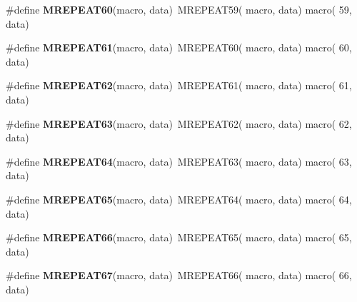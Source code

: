 \begin{DoxyCompactItemize}
\item 
\hypertarget{group__group__sam0__utils__mrepeat_ga4fd4e49134a22edba74f048333b8a4e6}{}\#define {\bfseries M\+R\+E\+P\+E\+A\+T60}(macro,  data)~M\+R\+E\+P\+E\+A\+T59( macro, data)   macro( 59, data)\label{group__group__sam0__utils__mrepeat_ga4fd4e49134a22edba74f048333b8a4e6}

\item 
\hypertarget{group__group__sam0__utils__mrepeat_ga91e94a0bcf2b901fcc9132cd2d20e5fc}{}\#define {\bfseries M\+R\+E\+P\+E\+A\+T61}(macro,  data)~M\+R\+E\+P\+E\+A\+T60( macro, data)   macro( 60, data)\label{group__group__sam0__utils__mrepeat_ga91e94a0bcf2b901fcc9132cd2d20e5fc}

\item 
\hypertarget{group__group__sam0__utils__mrepeat_gac1aeda59af63e68b3212be845b9b1f5a}{}\#define {\bfseries M\+R\+E\+P\+E\+A\+T62}(macro,  data)~M\+R\+E\+P\+E\+A\+T61( macro, data)   macro( 61, data)\label{group__group__sam0__utils__mrepeat_gac1aeda59af63e68b3212be845b9b1f5a}

\item 
\hypertarget{group__group__sam0__utils__mrepeat_ga73cede98c09bbcf55a373fbd3cfef422}{}\#define {\bfseries M\+R\+E\+P\+E\+A\+T63}(macro,  data)~M\+R\+E\+P\+E\+A\+T62( macro, data)   macro( 62, data)\label{group__group__sam0__utils__mrepeat_ga73cede98c09bbcf55a373fbd3cfef422}

\item 
\hypertarget{group__group__sam0__utils__mrepeat_gae9165e7c138bde7089d78f4d39123c80}{}\#define {\bfseries M\+R\+E\+P\+E\+A\+T64}(macro,  data)~M\+R\+E\+P\+E\+A\+T63( macro, data)   macro( 63, data)\label{group__group__sam0__utils__mrepeat_gae9165e7c138bde7089d78f4d39123c80}

\item 
\hypertarget{group__group__sam0__utils__mrepeat_ga823d5579d3d70018be17ac8323d074be}{}\#define {\bfseries M\+R\+E\+P\+E\+A\+T65}(macro,  data)~M\+R\+E\+P\+E\+A\+T64( macro, data)   macro( 64, data)\label{group__group__sam0__utils__mrepeat_ga823d5579d3d70018be17ac8323d074be}

\item 
\hypertarget{group__group__sam0__utils__mrepeat_ga900ae85fc32323d04086e2dd4ce7a275}{}\#define {\bfseries M\+R\+E\+P\+E\+A\+T66}(macro,  data)~M\+R\+E\+P\+E\+A\+T65( macro, data)   macro( 65, data)\label{group__group__sam0__utils__mrepeat_ga900ae85fc32323d04086e2dd4ce7a275}

\item 
\hypertarget{group__group__sam0__utils__mrepeat_ga4cb1fbebc5e11842a5e69ce245997668}{}\#define {\bfseries M\+R\+E\+P\+E\+A\+T67}(macro,  data)~M\+R\+E\+P\+E\+A\+T66( macro, data)   macro( 66, data)\label{group__group__sam0__utils__mrepeat_ga4cb1fbebc5e11842a5e69ce245997668}


\end{DoxyCompactItemize}
